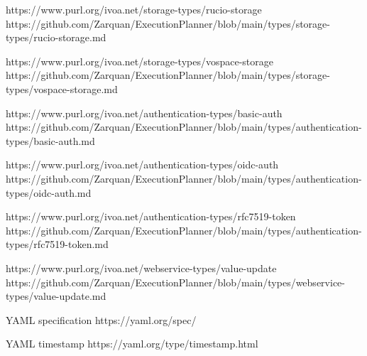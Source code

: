 \documentclass[11pt,a4paper]{ivoa}
\begin{document}
https://www.purl.org/ivoa.net/storage-types/rucio-storage
https://github.com/Zarquan/ExecutionPlanner/blob/main/types/storage-types/rucio-storage.md

https://www.purl.org/ivoa.net/storage-types/vospace-storage
https://github.com/Zarquan/ExecutionPlanner/blob/main/types/storage-types/vospace-storage.md

https://www.purl.org/ivoa.net/authentication-types/basic-auth
https://github.com/Zarquan/ExecutionPlanner/blob/main/types/authentication-types/basic-auth.md

https://www.purl.org/ivoa.net/authentication-types/oidc-auth
https://github.com/Zarquan/ExecutionPlanner/blob/main/types/authentication-types/oidc-auth.md

https://www.purl.org/ivoa.net/authentication-types/rfc7519-token
https://github.com/Zarquan/ExecutionPlanner/blob/main/types/authentication-types/rfc7519-token.md

https://www.purl.org/ivoa.net/webservice-types/value-update
https://github.com/Zarquan/ExecutionPlanner/blob/main/types/webservice-types/value-update.md

YAML specification
https://yaml.org/spec/

YAML timestamp
https://yaml.org/type/timestamp.html


\end{document}
